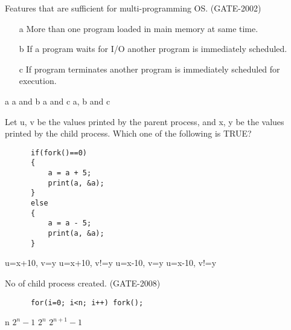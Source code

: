 
\begin{questyle}

  \question  Features that are sufficient for multi-programming OS. (GATE-2002)

   \begin{enumerate}
      \item[a] More than one program loaded in main memory at same time.
      \item[b] If a program waits for I/O another program is immediately scheduled.
      \item[c] If program terminates another program is immediately scheduled for execution.
   \end{enumerate}

  \begin{oneparchoices}
    \choice a
    \CorrectChoice a and b
    \choice a and c
    \choice a, b and c
  \end{oneparchoices}

\end{questyle}




\begin{questyle}

  \question  Let u, v be the values printed by the parent process, and x, y be the
            values printed by the child process. Which one of the following is TRUE?

    \begin{lstlisting}
      if(fork()==0)
      {
          a = a + 5;
          print(a, &a);
      }
      else
      {
          a = a - 5;
          print(a, &a);
      }
    \end{lstlisting}

  \begin{oneparchoices}
    \choice u=x+10, v=y
    \choice u=x+10, v!=y
    \CorrectChoice u=x-10, v=y
    \choice u=x-10, v!=y
  \end{oneparchoices}

  \end{questyle}




\begin{questyle}

  \question  No of child process created. (GATE-2008)

  \begin{lstlisting}
      for(i=0; i<n; i++) fork();
  \end{lstlisting}

  \begin{oneparchoices}
    \choice n
    \CorrectChoice \(2^n -1 \)
    \choice \(2^n \)
    \choice \(2^{n+1} -1 \)
  \end{oneparchoices}

\end{questyle}



